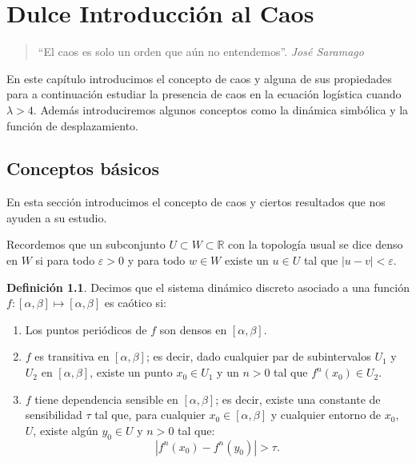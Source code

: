 \documentclass[12pt,a4paper]{report}
\theoremstyle{definition}
\newtheorem{definicion}{Definición}[section]
\begin{document}
\chapter{Dulce Introducción al Caos}\label{chap:caos}

\begin{quote}
\centering
“El caos es solo un orden que aún no entendemos”. \textit{José Saramago}
\end{quote}

En este capítulo introducimos el concepto de caos y alguna de sus propiedades para a continuación estudiar la presencia de caos en la ecuación logística cuando $\lambda > 4$. Además introduciremos algunos conceptos como la dinámica simbólica y la función de desplazamiento.

\section{Conceptos básicos}

En esta sección introducimos el concepto de caos y ciertos resultados que nos ayuden a su estudio.


Recordemos que un subconjunto $ U \subset W \subset \mathbb{R}$ con la topología usual se dice denso en $ W $ si para todo $\varepsilon > 0$ y para todo $w \in W$ existe un $u \in U$ tal que $|u - v| < \varepsilon$.

\medskip

\begin{definicion}

Decimos que el sistema dinámico discreto asociado a una función $ f : [\alpha, \beta] \mapsto [\alpha, \beta]$ es caótico si:

\begin{enumerate}
    \item Los puntos periódicos de $ f $ son densos en $ [\alpha, \beta] $.
    \item $ f $ es transitiva en $ [\alpha, \beta] $; es decir, dado cualquier par de subintervalos $ U_1 $ y $ U_2 $ en $ [\alpha, \beta] $, existe un punto $ x_0 \in U_1 $ y un $ n > 0 $ tal que $ f^n(x_0) \in U_2 $.
    \item $ f $ tiene dependencia sensible en $  [\alpha, \beta] $; es decir, existe una constante de sensibilidad $ \tau $ tal que, para cualquier $ x_0 \in [\alpha, \beta] $ y cualquier entorno de $ x_0 $, $ U $, existe algún $ y_0 \in U $ y $ n > 0 $ tal que:
    \[
    |f^n(x_0) - f^n(y_0)| > \tau.
    \]
\end{enumerate}

\end{definicion}
\end{document}
